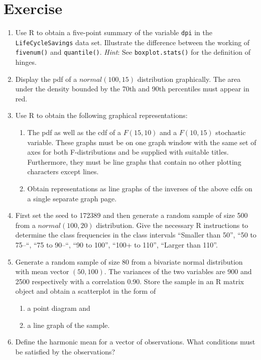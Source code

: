 \documentclass[
]{book}
\providecommand{\tightlist}{%
  \setlength{\itemsep}{0pt}\setlength{\parskip}{0pt}}
\begin{document}
\section{Exercise}\label{Ex6}

\begin{enumerate}
\def\labelenumi{\arabic{enumi}.}
\item
  Use R to obtain a five-point summary of the variable \texttt{dpi} in the \texttt{LifeCycleSavings} data set. Illustrate the difference between the working of \texttt{fivenum()} and \texttt{quantile()}. \emph{Hint}: See \texttt{boxplot.stats()} for the definition of hinges.
\item
  Display the pdf of a \(normal (100, 15)\) distribution graphically. The area under the density bounded by the 70th and 90th percentiles must appear in red.
\item
  Use R to obtain the following graphical representations:

  \begin{enumerate}
  \def\labelenumii{(\roman{enumii})}
  \item
    The pdf as well as the cdf of a \(F (15, 10)\) and a \(F (10, 15)\) stochastic variable. These graphs must be on one graph window with the same set of axes for both F-distributions and be supplied with suitable titles. Furthermore, they must be line graphs that contain no other plotting characters except lines.
  \item
    Obtain representations as line graphs of the inverses of the above cdfs on a single separate graph page.
  \end{enumerate}
\item
  First set the seed to 172389 and then generate a random sample of size 500 from a \(normal (100, 20)\) distribution. Give the necessary R instructions to determine the class frequencies in the class intervals ``Smaller than 50'', ``50 to 75--``, ``75 to 90--``, ``90 to 100'', ``100+ to 110'', ``Larger than 110''.
\item
  Generate a random sample of size 80 from a bivariate normal distribution with mean vector \((50, 100)\). The variances of the two variables are 900 and 2500 respectively with a correlation 0.90. Store the sample in an R matrix object and obtain a scatterplot in the form of

  \begin{enumerate}
  \def\labelenumii{(\roman{enumii})}
  \tightlist
  \item
    a point diagram and
  \item
    a line graph of the sample.
  \end{enumerate}
\item
  Define the harmonic mean for a vector of observations. What conditions must be satisfied by the observations?


\end{enumerate}
\end{document}
